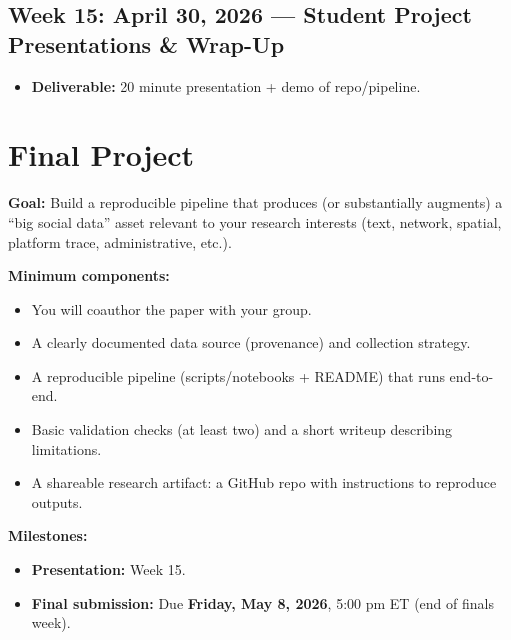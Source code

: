 \documentclass[letterpaper,11pt]{article}
\newcommand{\compresslist}{
\setlength{\itemsep}{1pt}
\setlength{\parskip}{0pt}
\setlength{\parsep}{0pt}
}
\begin{document}
\subsection*{Week 15: April 30, 2026 --- Student Project Presentations \& Wrap-Up}
\begin{itemize}\compresslist
\item \textbf{Deliverable:} 20 minute presentation + demo of repo/pipeline.
\end{itemize}
\section*{Final Project}
\textbf{Goal:} Build a reproducible pipeline that produces (or substantially augments) a ``big social data'' asset relevant to your research interests (text, network, spatial, platform trace, administrative, etc.).

\medskip
\noindent \textbf{Minimum components:}
\begin{itemize}\compresslist
\item You will coauthor the paper with your group. 
\item A clearly documented data source (provenance) and collection strategy.
\item A reproducible pipeline (scripts/notebooks + README) that runs end-to-end.
\item Basic validation checks (at least two) and a short writeup describing limitations.
\item A shareable research artifact: a GitHub repo with instructions to reproduce outputs.
\end{itemize}

\medskip
\noindent \textbf{Milestones:}
\begin{itemize}\compresslist
\item \textbf{Presentation:} Week 15.
\item \textbf{Final submission:} Due \textbf{Friday, May 8, 2026}, 5:00 pm ET (end of finals week).
\end{itemize}
\end{document}
